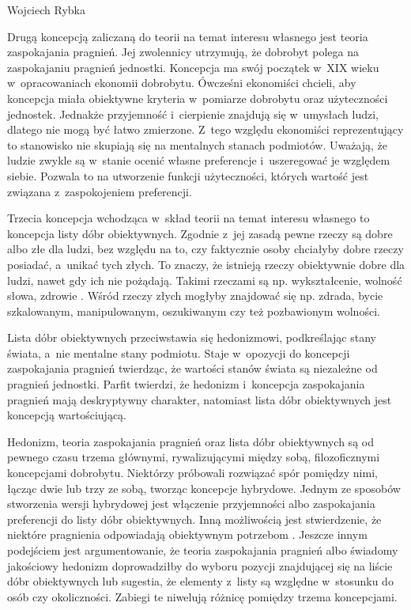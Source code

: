 \begin{artplenv}{Wojciech Rybka}
\enlargethispage{1\baselineskip}

Drugą koncepcją zaliczaną do teorii na temat interesu własnego jest teoria zaspokajania pragnień. Jej zwolennicy
utrzymują, że dobrobyt polega na zaspokajaniu pragnień jednostki. Koncepcja ma swój początek w~XIX
wieku w~opracowaniach ekonomii dobrobytu. Ówcześni ekonomiści chcieli, aby koncepcja miała obiektywne kryteria w~pomiarze
dobrobytu oraz użyteczności jednostek. Jednakże przyjemność i~cierpienie znajdują się w~umysłach ludzi, dlatego nie
mogą być łatwo zmierzone. Z~tego względu ekonomiści reprezentujący to stanowisko nie skupiają się na mentalnych stanach
podmiotów. Uważają, że ludzie zwykle są w~stanie ocenić własne preferencje i~uszeregować je względem siebie. Pozwala to
na utworzenie funkcji użyteczności, których wartość jest związana z~zaspokojeniem preferencji.

Trzecia koncepcja wchodząca w~skład teorii na temat interesu własnego to koncepcja listy dóbr obiektywnych.
Zgodnie z~jej zasadą pewne rzeczy są dobre albo złe dla ludzi, bez względu na to, czy faktycznie osoby chciałyby dobre rzeczy
posiadać, a~unikać tych złych. To znaczy, że istnieją rzeczy obiektywnie dobre dla ludzi, nawet gdy ich nie pożądają.
Takimi rzeczami są np. wykształcenie, wolność słowa, zdrowie
\parencite{mill_utylitaryzm:_1959}.
Wśród rzeczy złych
mogłyby znajdować się np. zdrada, bycie szkalowanym, manipulowanym, oszukiwanym czy też pozbawionym wolności. 

Lista dóbr obiektywnych przeciwstawia się hedonizmowi, podkreślając stany świata, a~nie mentalne stany podmiotu.
Staje w~opozycji do koncepcji zaspokajania pragnień twierdząc, że wartości stanów świata są niezależne od pragnień jednostki.
Parfit
\parencite*{parfit_racje_2012}
twierdzi, że hedonizm i~koncepcja zaspokajania pragnień mają deskryptywny
charakter, natomiast lista dóbr obiektywnych jest koncepcją wartościującą.

\enlargethispage{1\baselineskip}

Hedonizm, teoria zaspokajania pragnień oraz lista dóbr obiektywnych są od pewnego czasu trzema głównymi, rywalizującymi
między sobą, filozoficznymi koncepcjami dobrobytu. Niektórzy próbowali rozwiązać spór pomiędzy nimi, łącząc dwie lub
trzy ze sobą, tworząc koncepcje hybrydowe. Jednym ze sposobów stworzenia wersji hybrydowej jest włączenie przyjemności
albo zaspokajania preferencji do listy dóbr obiektywnych. Inną możliwością jest stwierdzenie, że niektóre pragnienia
odpowiadają obiektywnym potrzebom
\parencite{hamilton_political_2003}.
Jeszcze innym podejściem jest
argumentowanie, że teoria zaspokajania pragnień albo świadomy jakościowy hedonizm doprowadziłby do wyboru pozycji
znajdującej się na liście dóbr obiektywnych lub sugestia, że elementy z~listy są względne w~stosunku do osób czy
okoliczności. Zabiegi te niwelują różnicę pomiędzy trzema koncepcjami.


\end{artplenv}
